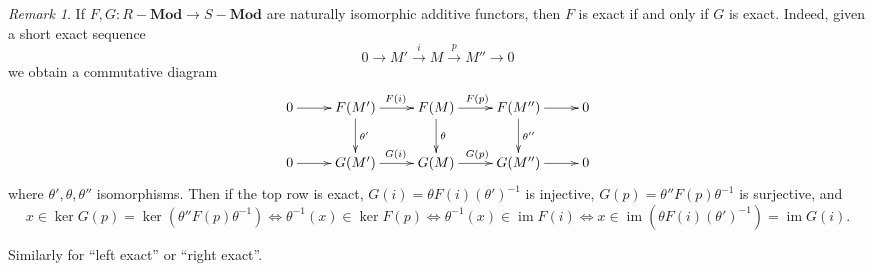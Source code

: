 \documentclass{amsart}[12pt]
\def\image{\operatorname{im}}
\def\im{\image}
\def\ker{\operatorname{ker}}
\numberwithin{equation}{section}
\theoremstyle{plain} %
\theoremstyle{definition}
\theoremstyle{remark}
\newtheorem{rem}[equation]{Remark}
\newcommand{\xra}[1]{\xrightarrow{#1}}
\newcommand{\Mod}[1]{#1-\mathbf{Mod}}
\begin{document}
\begin{rem} If $F,G:\Mod{R} \to \Mod{S}$ are naturally isomorphic additive functors, then $F$ is exact if and only if $G$ is exact. Indeed, given a short exact sequence
\[ 0 \to M' \xra{i} M \xra{p} M'' \to 0\]
we obtain a commutative diagram
\[\xymatrix{
0 \ar[r] & F(M') \ar[r]^{F(i)} \ar[d]^-{\theta'} & F(M) \ar[r]^{F(p)} \ar[d]^-{\theta} & F(M'') \ar[r]\ar[d]^-{\theta''} & 0 \\
0 \ar[r] & G(M') \ar[r]^{G(i)}  & G(M) \ar[r]^{G(p)}  & G(M'') \ar[r] & 0 }\]
where $\theta',\theta,\theta''$ isomorphisms.
Then if the top row is exact, $G(i)=\theta F(i) (\theta')^{-1}$ is injective, $G(p)=\theta''  F(p) \theta^{-1}$ is surjective, and \[x\in \ker G(p) = \ker(\theta''  F(p) \theta^{-1}) \iff \theta^{-1} (x) \in \ker F(p) \iff \theta^{-1} (x) \in \im F(i) \iff x\in \im(\theta F(i) (\theta')^{-1}) = \im G(i).\]

Similarly for ``left exact'' or ``right exact''.
\end{rem}
\end{document}
